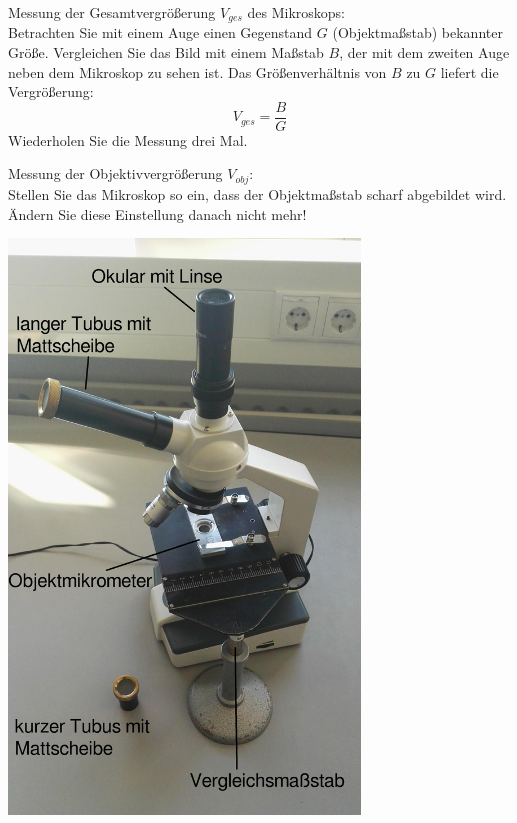 \begin{enumerate}
\begin{minipage}{0.5\textwidth}
 \item Messung der Gesamtvergrößerung $V_{ges}$ des Mikroskops:\\
  Betrachten Sie mit einem Auge einen Gegenstand $G$ (Objektmaßstab) bekannter Größe. Vergleichen Sie das Bild mit einem Maßstab $B$, der mit dem zweiten Auge neben dem Mikroskop zu sehen ist. Das Größenverhältnis von $B$ zu $G$ liefert die Vergrößerung:
  \[
  V_{ges} = \frac{B}{G}
  \]
  Wiederholen Sie die Messung drei Mal.
	\item Messung der Objektivvergrößerung $V_{obj}$:\\
  Stellen Sie das Mikroskop so ein, dass der Objektmaßstab scharf abgebildet wird. Ändern Sie diese Einstellung danach nicht mehr!\\
\end{minipage}
%
\begin{minipage}{0.5\textwidth}
	\centering
		\includegraphics[width=0.7\textwidth]{Abbildungen/mikroskopbildA.jpg}
	\label{fig:mikroskopbildA}
\end{minipage}
 

\end{enumerate}
